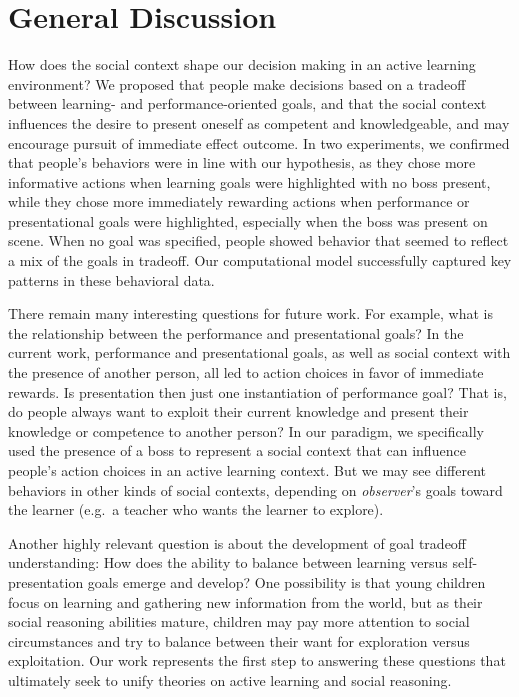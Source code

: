 \documentclass[10pt, letterpaper]{article}
\begin{document}
\section{General Discussion}\label{general-discussion}

How does the social context shape our decision making in an active
learning environment? We proposed that people make decisions based on a
tradeoff between learning- and performance-oriented goals, and that the
social context influences the desire to present oneself as competent and
knowledgeable, and may encourage pursuit of immediate effect outcome. In
two experiments, we confirmed that people's behaviors were in line with
our hypothesis, as they chose more informative actions when learning
goals were highlighted with no boss present, while they chose more
immediately rewarding actions when performance or presentational goals
were highlighted, especially when the boss was present on scene. When no
goal was specified, people showed behavior that seemed to reflect a mix
of the goals in tradeoff. Our computational model successfully captured
key patterns in these behavioral data.

There remain many interesting questions for future work. For example,
what is the relationship between the performance and presentational
goals? In the current work, performance and presentational goals, as
well as social context with the presence of another person, all led to
action choices in favor of immediate rewards. Is presentation then just
one instantiation of performance goal? That is, do people always want to
exploit their current knowledge and present their knowledge or
competence to another person? In our paradigm, we specifically used the
presence of a boss to represent a social context that can influence
people's action choices in an active learning context. But we may see
different behaviors in other kinds of social contexts, depending on
\emph{observer}'s goals toward the learner (e.g.~a teacher who wants the
learner to explore).

Another highly relevant question is about the development of goal
tradeoff understanding: How does the ability to balance between learning
versus self-presentation goals emerge and develop? One possibility is
that young children focus on learning and gathering new information from
the world, but as their social reasoning abilities mature, children may
pay more attention to social circumstances and try to balance between
their want for exploration versus exploitation. Our work represents the
first step to answering these questions that ultimately seek to unify
theories on active learning and social reasoning.
\end{document}
